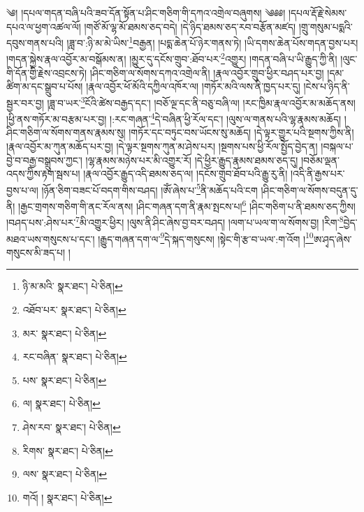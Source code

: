 \setcounter{footnote}{0} 
༄། །དཔལ་གདན་བཞི་པའི་ཟབ་དོན་སྟོན་པ་ཤིང་གཅིག་གི་དཀའ་འགྲེལ་བཞུགས། ༄༅༅། །དཔལ་རྡོ་རྗེ་སེམས་དཔའ་ལ་ཕྱག་འཚལ་ལོ། །གཙོ་མོ་ལྷ་མོ་ཐམས་ཅད་བདེ། །དེ་ཉིད་ཐམས་ཅད་རབ་བརྩོན་མཛད། །གྲུ་གསུམ་པདྨའི་དབུས་གནས་པའི། །ཟླ་བ་:ཉི་མ་མེ་ཡིས་\footnote{ཉི་མ་མའི་  སྣར་ཐང་།  པེ་ཅིན། }བརྒྱན། །པདྨ་ཆེན་པོ་ཉེར་གནས་ཏེ། །ཡི་དགས་ཆེན་པོས་གདན་བྱས་པར། །གདན་སྐྱེས་རྣལ་འབྱོར་མ་བསྒོམས་ན། །མྱུར་དུ་དངོས་གྲུབ་:ཐོབ་པར་\footnote{འཐོབ་པར་  སྣར་ཐང་།  པེ་ཅིན། }འགྱུར། །གདན་བཞི་པ་ཡི་རྒྱུད་ཀྱི་ནི། །ལུང་གི་དོན་གྱི་རྗེས་འབྲངས་ཏེ། །ཤིང་གཅིག་ལ་སོགས་དཀའ་འགྲེལ་ནི། །རྣལ་འབྱོར་གྲུབ་ཕྱིར་བཤད་པར་བྱ། །དམ་ཚིག་མ་དང་སྒྲུབ་པ་པོས། །རྣལ་འབྱོར་ཕོ་མོའི་དཀྱིལ་འཁོར་ལ། །གཏོར་མའི་ལས་ནི་ཁྱད་པར་དུ། །ངེས་པ་ཉིད་ནི་སྦྱར་བར་བྱ། །ཟླ་བ་ཡར་\footnote{མར་  སྣར་ཐང་།  པེ་ཅིན། }ངོའི་ཚེས་བརྒྱད་དང་། །བཅོ་ལྔ་དང་ནི་བཅུ་བཞི་ལ། །རང་ཁྱིམ་རྣལ་འབྱོར་མ་མཆོད་ནས། །ཕྱི་ནས་གཏོར་མ་བརྩམ་པར་བྱ། །:རང་གཞན་\footnote{རང་བཞིན་  སྣར་ཐང་།  པེ་ཅིན། }དེ་བཞིན་ཕྱི་རོལ་དང་། །ལུས་ལ་གནས་པའི་ལྷ་རྣམས་མཆོད། །ཤིང་གཅིག་ལ་སོགས་གནས་རྣམས་སུ། །གཏོར་དང་བཏུང་བས་ཡོངས་སུ་མཆོད། །དེ་ལྟར་གྱུར་པའི་སྔགས་ཀྱིས་ནི། །རྣལ་འབྱོར་མ་ཀུན་མཆོད་པར་བྱ། །དེ་ལྟར་སྔགས་ཀུན་མ་ཤེས་པར། །སྔགས་པས་ཕྱི་རོལ་སྤྱོད་བྱེད་ན། །བསྐལ་པ་བྱེ་བ་བརྒྱ་བསྒྲུབས་ཀྱང་། །ལྷ་རྣམས་མཉེས་པར་མི་འགྱུར་རོ། །དེ་ཕྱིར་རྒྱུད་རྣམས་ཐམས་ཅད་དུ། །བཅོམ་ལྡན་འདས་ཀྱིས་རྟག་སྦས་པ། །རྣལ་འབྱོར་རྒྱུད་འདི་ཐམས་ཅད་ལ། །དངོས་གྲུབ་ཐོབ་པའི་རྒྱུ་རུ་ནི། །འདི་ནི་རྒྱས་པར་བྱས་པ་ལ། །ཉོན་ཅིག་བཟང་པོ་བདག་གིས་བཤད། །ཨོཾ་ཞེས་པ་\footnote{པས་  སྣར་ཐང་།  པེ་ཅིན། }ནི་མཆོད་པའི་ངག །ཤིང་གཅིག་ལ་སོགས་བདུན་དུ་ནི། །རྒྱང་གྲགས་གཅིག་གི་ནང་རོལ་ནས། །ཤིང་གཞན་དག་ནི་རྣམ་སྤངས་པ།\footnote{ལ།  སྣར་ཐང་།  པེ་ཅིན། } །ཤིང་གཅིག་པ་ནི་ཐམས་ཅད་ཀྱིས། །བཤད་པས་:ཤེས་པར་\footnote{ཤེས་རབ་  སྣར་ཐང་།  པེ་ཅིན། }མི་འགྱུར་ཕྱིར། །ལུས་ནི་ཤིང་ཞེས་བྱ་བར་བཤད། །ལག་པ་ཡལ་ག་ལ་སོགས་བྱ། །རིག་\footnote{རིགས་  སྣར་ཐང་།  པེ་ཅིན། }བྱེད་མཐའ་ཡས་གསུངས་པ་དང་། །རྒྱུད་གཞན་དག་ལ་\footnote{ལས་  སྣར་ཐང་།  པེ་ཅིན། }དེ་སྐད་གསུངས། །སྟེང་གི་རྩ་བ་ཡལ་:ག་འོག །\footnote{གའོ། །  སྣར་ཐང་།  པེ་ཅིན། }ཨ་ཤྭད་ཞེས་གསུངས་མི་ཟད་པ། །
